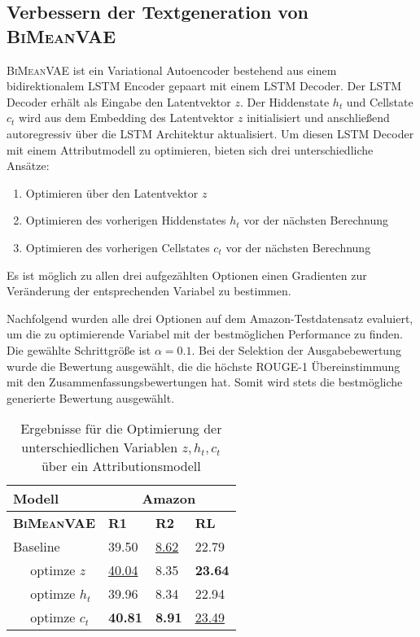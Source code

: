 \subsection{Verbessern der Textgeneration von \textsc{BiMeanVAE}}
\textsc{BiMeanVAE} ist ein Variational Autoencoder bestehend aus einem bidirektionalem LSTM Encoder gepaart mit einem LSTM Decoder.
Der LSTM Decoder erhält als Eingabe den Latentvektor $z$. Der Hiddenstate $h_t$ und Cellstate $c_t$ wird aus dem Embedding des Latentvektor $z$ initialisiert und anschließend autoregressiv über die LSTM Architektur aktualisiert.
Um diesen LSTM Decoder mit einem Attributmodell zu optimieren, bieten sich drei unterschiedliche Ansätze:
\begin{enumerate}
    \item Optimieren über den Latentvektor $z$
    \item Optimieren des vorherigen Hiddenstates $h_t$ vor der nächsten Berechnung
    \item Optimieren des vorherigen Cellstates $c_t$ vor der nächsten Berechnung
\end{enumerate}

Es ist möglich zu allen drei aufgezählten Optionen einen Gradienten zur Veränderung der entsprechenden Variabel zu bestimmen. 

Nachfolgend wurden alle drei Optionen auf dem Amazon-Testdatensatz evaluiert, um die zu optimierende Variabel mit der bestmöglichen Performance zu finden.
Die gewählte Schrittgröße ist $\alpha = 0.1$.
Bei der Selektion der Ausgabebewertung wurde die Bewertung ausgewählt, die die höchste ROUGE-1 Übereinstimmung mit den Zusammenfassungsbewertungen hat.
Somit wird stets die bestmögliche generierte Bewertung ausgewählt.

\begin{table}[h!]
    \centering
    \begin{tabular}{@{}llll@{}}
    \toprule
                    Modell   & \multicolumn{3}{c}{Amazon}              \\ \midrule
    \textbf{\textsc{BiMeanVAE}}    & \textbf{R1} & \textbf{R2} & \textbf{RL} \\ \midrule
    Baseline        & 39.50       & \underline{8.62}     &  22.79     \\
    $\quad$ optimze $z$        &   \underline{40.04}     &   8.35    &    \textbf{23.64}   \\
    $\quad$ optimze $h_t$      &  39.96   &    8.34  &  22.94  \\
    $\quad$ optimze $c_t$      &  \textbf{40.81}   &     \textbf{8.91}  &   \underline{23.49}    \\ \bottomrule
    \end{tabular}
    \caption{Ergebnisse für die Optimierung der unterschiedlichen Variablen $z,h_t,c_t$ über ein Attributionsmodell}
    \label{opt_bimeanvae}
\end{table}

